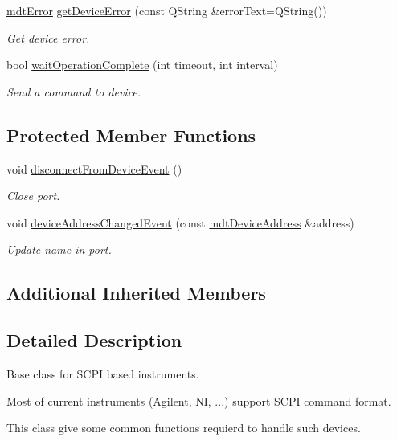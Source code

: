 \begin{DoxyCompactItemize}
\hyperlink{classmdt_error}{mdt\-Error} \hyperlink{classmdt_device_scpi_a45093d4dac06457ee088f45cbec79f3d}{get\-Device\-Error} (const Q\-String \&error\-Text=Q\-String())
\begin{DoxyCompactList}\small\item\em Get device error. \end{DoxyCompactList}\item 
bool \hyperlink{classmdt_device_scpi_aefd45e58d01aed9a165bb2c2dd98198c}{wait\-Operation\-Complete} (int timeout, int interval)
\begin{DoxyCompactList}\small\item\em Send a command to device. \end{DoxyCompactList}\end{DoxyCompactItemize}
\subsection*{Protected Member Functions}
\begin{DoxyCompactItemize}
\item 
void \hyperlink{classmdt_device_scpi_a32498c40ac609ac157cb332bc4e7ac51}{disconnect\-From\-Device\-Event} ()
\begin{DoxyCompactList}\small\item\em Close port. \end{DoxyCompactList}\item 
void \hyperlink{classmdt_device_scpi_a311158761051b12489c15e068a9d1db3}{device\-Address\-Changed\-Event} (const \hyperlink{classmdt_device_address}{mdt\-Device\-Address} \&address)
\begin{DoxyCompactList}\small\item\em Update name in port. \end{DoxyCompactList}\end{DoxyCompactItemize}
\subsection*{Additional Inherited Members}


\subsection{Detailed Description}
Base class for S\-C\-P\-I based instruments. 

Most of current instruments (Agilent, N\-I, ...) support S\-C\-P\-I command format.

This class give some common functions requierd to handle such devices.

